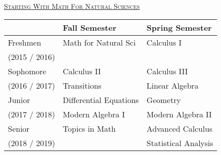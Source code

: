 \documentclass[letterpaper,10pt]{article}
\begin{document}
\bigskip

\begin{center}
\begin{minipage}[t]{.45\textwidth}

\underline{\scshape  \Large Starting With Math For Natural Sciences}\\


\begin{tabular}{l|l|l}
	&{\bf Fall Semester} & {\bf Spring Semester}\\
\hline
Freshmen & Math for Natural Sci & Calculus I \\
\scriptsize (2015 / 2016) & & \\
\hline
Sophomore & Calculus II & Calculus III\\
\scriptsize (2016 / 2017) & Transitions & Linear Algebra\\[2pt]
\hline
Junior & Differential Equations & Geometry \\
\scriptsize (2017 / 2018)& Modern Algebra I & Modern Algebra II\\[2pt]
\hline
Senior & {\color{gray}Topics in Math} &  Advanced Calculus \\
\scriptsize (2018 / 2019)&   & Statistical Analysis
\end{tabular} 
\end{minipage}
\end{center}
\vspace{0.15in}
\end{document}
